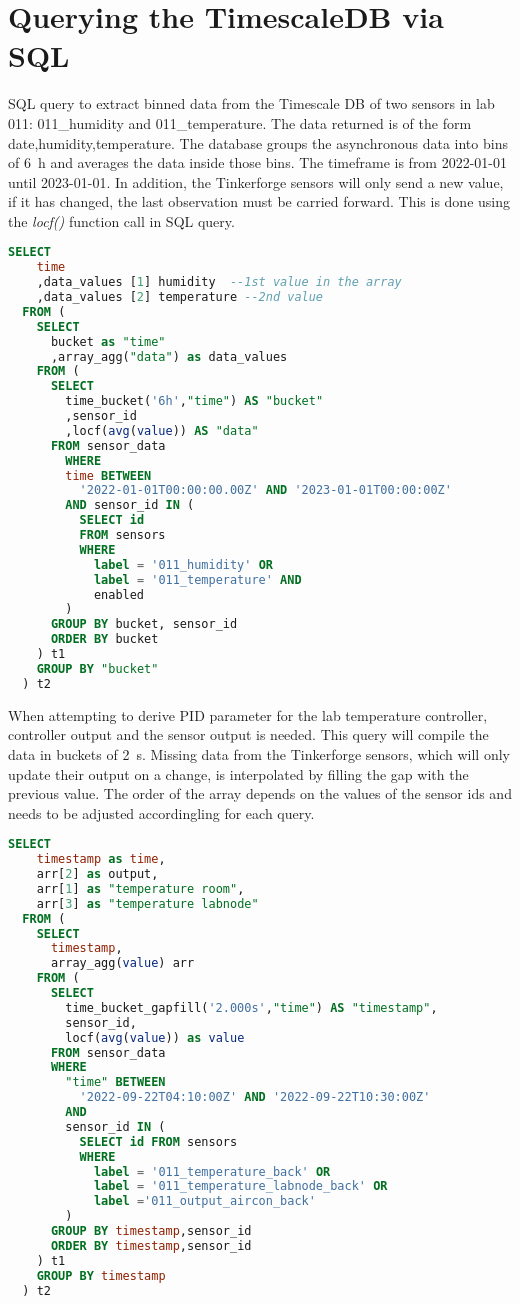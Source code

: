 \documentclass[12pt]{book}
\begin{document}
\section{Querying the TimescaleDB via SQL}%
\label{sec:appendix_query_kraken}
SQL query to extract binned data from the Timescale DB of two sensors in lab 011: \textsf{011\_humidity} and \textsf{011\_temperature}. The data returned is of the form \textsf{date,humidity,temperature}. The database groups the asynchronous data into bins of \qty{6}{\hour} and averages the data inside those bins. The timeframe is from 2022-01-01 until 2023-01-01. In addition, the Tinkerforge sensors will only send a new value, if it has changed, the last observation must be carried forward. This is done using the \textit{locf()} function call in SQL query.

\begin{lstlisting}[language=sql,title=SQL query]
  SELECT
    time
    ,data_values [1] humidity  --1st value in the array
    ,data_values [2] temperature --2nd value
  FROM (
    SELECT
      bucket as "time"
      ,array_agg("data") as data_values
    FROM (
      SELECT
        time_bucket('6h',"time") AS "bucket"
        ,sensor_id
        ,locf(avg(value)) AS "data"
      FROM sensor_data
        WHERE
        time BETWEEN
          '2022-01-01T00:00:00.00Z' AND '2023-01-01T00:00:00Z'
        AND sensor_id IN (
          SELECT id
          FROM sensors
          WHERE
            label = '011_humidity' OR
            label = '011_temperature' AND
            enabled
        )
      GROUP BY bucket, sensor_id
      ORDER BY bucket
    ) t1
    GROUP BY "bucket"
  ) t2
\end{lstlisting}

\clearpage
When attempting to derive PID parameter for the lab temperature controller, controller output and the sensor output is needed. This query will compile the data in buckets of \qty{2}{\s}. Missing data from the Tinkerforge sensors, which will only update their output on a change, is interpolated by filling the gap with the previous value. The order of the array depends on the values of the sensor ids and needs to be adjusted accordingling for each query.

\begin{lstlisting}[language=sql,title=SQL query]
  SELECT
    timestamp as time,
    arr[2] as output,
    arr[1] as "temperature room",
    arr[3] as "temperature labnode"
  FROM (
    SELECT
      timestamp,
      array_agg(value) arr
    FROM (
      SELECT
        time_bucket_gapfill('2.000s',"time") AS "timestamp",
        sensor_id,
        locf(avg(value)) as value
      FROM sensor_data
      WHERE
        "time" BETWEEN
          '2022-09-22T04:10:00Z' AND '2022-09-22T10:30:00Z'
        AND
        sensor_id IN (
          SELECT id FROM sensors
          WHERE
            label = '011_temperature_back' OR
            label = '011_temperature_labnode_back' OR
            label ='011_output_aircon_back'
        )
      GROUP BY timestamp,sensor_id
      ORDER BY timestamp,sensor_id
    ) t1
    GROUP BY timestamp
  ) t2
\end{lstlisting}
\end{document}
